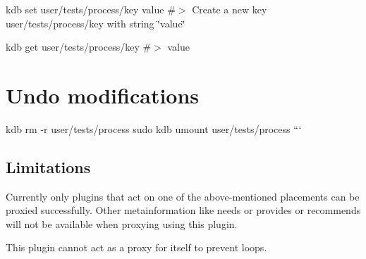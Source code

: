 kdb set user/tests/process/key value \#$>$ Create a new key user/tests/process/key with string \char`\"{}value\char`\"{}

kdb get user/tests/process/key \#$>$ value

\section*{Undo modifications}

kdb rm -\/r user/tests/process sudo kdb umount user/tests/process ```

\subsection*{Limitations}


\begin{DoxyItemize}
\item Currently only plugins that act on one of the above-\/mentioned {\ttfamily placements} can be proxied successfully. Other metainformation like {\ttfamily needs} or {\ttfamily provides} or {\ttfamily recommends} will not be available when proxying using this plugin.
\item This plugin cannot act as a proxy for itself to prevent loops. 
\end{DoxyItemize}